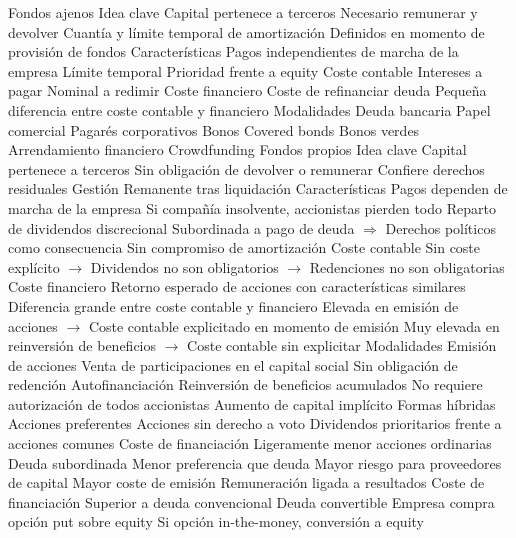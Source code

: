 \documentclass{nuevotema}
\begin{document}
\begin{esquemal}
		\2 Fondos ajenos
			\3 Idea clave
				\4 Capital pertenece a terceros
				\4 Necesario remunerar y devolver
				\4 Cuantía y límite temporal de amortización
				\4[] Definidos en momento de provisión de fondos
			\3 Características
				\4 Pagos independientes de marcha de la empresa
				\4 Límite temporal
				\4 Prioridad frente a equity
				\4 Coste contable
				\4[] Intereses a pagar
				\4[] Nominal a redimir
				\4 Coste financiero
				\4[] Coste de refinanciar deuda
				\4 Pequeña diferencia entre coste contable y financiero
			\3 Modalidades
				\4 Deuda bancaria
				\4 Papel comercial
				\4 Pagarés corporativos
				\4 Bonos
				\4 Covered bonds
				\4 Bonos verdes
				\4 Arrendamiento financiero
				\4 Crowdfunding
		\2 Fondos propios
			\3 Idea clave
				\4 Capital pertenece a terceros
				\4 Sin obligación de devolver o remunerar
				\4 Confiere derechos residuales
				\4[] Gestión
				\4[] Remanente tras liquidación
			\3 Características
				\4 Pagos dependen de marcha de la empresa
				\4[] Si compañía insolvente, accionistas pierden todo
				\4[] Reparto de dividendos discrecional
				\4[] Subordinada a pago de deuda
				\4[] $\Rightarrow$ Derechos políticos como consecuencia
				\4 Sin compromiso de amortización
				\4 Coste contable
				\4[] Sin coste explícito
				\4[] $\to$ Dividendos no son obligatorios
				\4[] $\to$ Redenciones no son obligatorias
				\4 Coste financiero
				\4[] Retorno esperado de acciones con características similares
				\4 Diferencia grande entre coste contable y financiero
				\4[] Elevada en emisión de acciones
				\4[] $\to$ Coste contable explicitado en momento de emisión
				\4[] Muy elevada en reinversión de beneficios
				\4[] $\to$ Coste contable sin explicitar
			\3 Modalidades
				\4 Emisión de acciones
				\4[] Venta de participaciones en el capital social
				\4[] Sin obligación de redención
				\4 Autofinanciación
				\4[] Reinversión de beneficios acumulados
				\4[] No requiere autorización de todos accionistas
				\4[] Aumento de capital implícito
		\2 Formas híbridas
			\3 Acciones preferentes
				\4 Acciones sin derecho a voto
				\4 Dividendos prioritarios frente a acciones comunes
				\4 Coste de financiación
				\4[] Ligeramente menor acciones ordinarias
			\3 Deuda subordinada
				\4 Menor preferencia que deuda
				\4 Mayor riesgo para proveedores de capital
				\4 Mayor coste de emisión
				\4 Remuneración ligada a resultados
				\4 Coste de financiación
				\4[] Superior a deuda convencional
			\3 Deuda convertible
				\4 Empresa compra opción put sobre equity
				\4[] Si opción in-the-money, conversión a equity

\end{esquemal}
\end{document}
